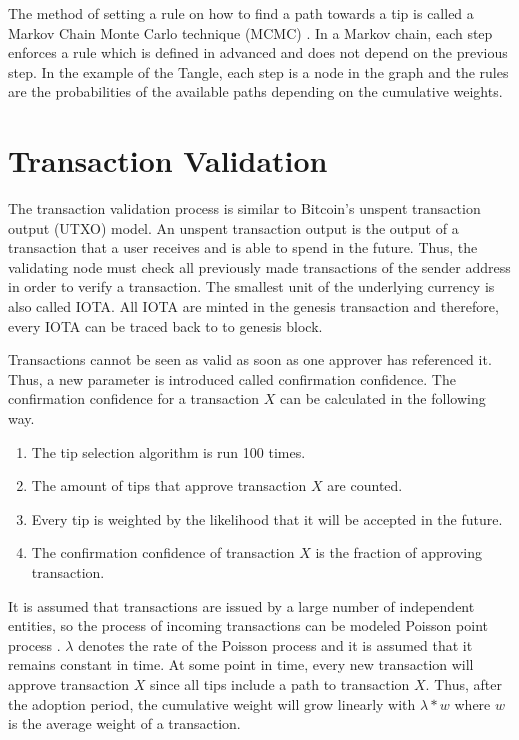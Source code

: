 The method of setting a rule on how to find a path towards a tip is called a Markov Chain Monte Carlo technique (MCMC) \cite{mcmc}. In a Markov chain, each step enforces a rule which is defined in advanced and does not depend on the previous step. In the example of the Tangle, each step is a node in the graph and the rules are the probabilities of the available paths depending on the cumulative weights.

\section{Transaction Validation}\label{transaction-validation}
The transaction validation process is similar to Bitcoin's unspent transaction output (UTXO) model. An unspent transaction output is the output of a transaction that a user receives and is able to spend in the future. Thus, the validating node must check all previously made transactions of the sender address in order to verify a transaction. The smallest unit of the underlying currency is also called IOTA. All IOTA are minted in the genesis transaction and therefore, every IOTA can be traced back to to genesis block. 

Transactions cannot be seen as valid as soon as one approver has referenced it. Thus, a new parameter is introduced called confirmation confidence. The confirmation confidence for a transaction $X$ can be calculated in the following way.

\begin{enumerate}
    \item The tip selection algorithm is run 100 times.
    \item The amount of tips that approve transaction $X$ are counted.
    \item Every tip is weighted by the likelihood that it will be accepted in the future.
    \item The confirmation confidence of transaction $X$ is the fraction of approving transaction.
\end{enumerate}

It is assumed that transactions are issued by a large number of independent entities, so the process of incoming transactions can be modeled Poisson point process \cite{the-tangle}. $\lambda$ denotes the rate of the Poisson process and it is assumed that it remains constant in time. At some point in time, every new transaction will approve transaction $X$ since all tips include a path to transaction $X$. Thus, after the adoption period, the cumulative weight will grow linearly with $\lambda * w$ where $w$ is the average weight of a transaction.

